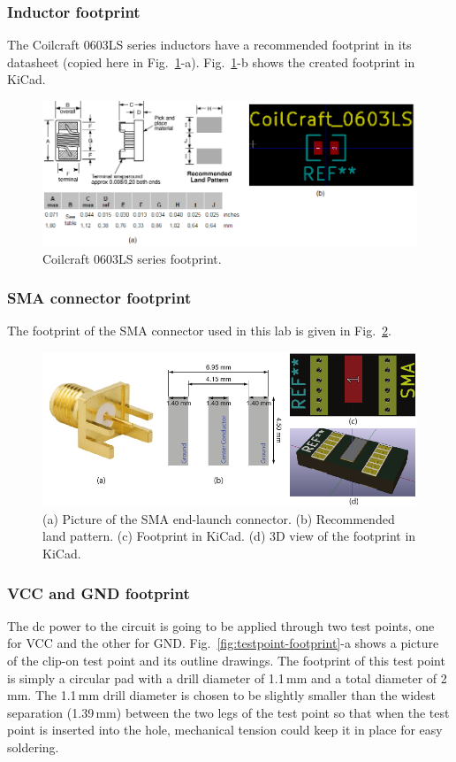 \documentclass[12pt,letterpaper]{scrartcl}
\begin{document}
\subsubsection{Inductor footprint}

The Coilcraft 0603LS series inductors have a recommended footprint in its datasheet (copied here in Fig.~\ref{fig:cc-0603ls}-a). Fig.~\ref{fig:cc-0603ls}-b shows the created footprint in KiCad. 

	\begin{figure}[ph]
		\centering
		\includegraphics[width=5.5in]{cc-0603ls}
		\caption{Coilcraft 0603LS series footprint.}
		\label{fig:cc-0603ls}
	\end{figure}

\subsubsection{SMA connector footprint}
The footprint of the SMA connector used in this lab is given in Fig.~\ref{fig:sma-footprint}. 

	\begin{figure}[ph]
		\centering
		\includegraphics[width=5.5in]{sma-footprint}
		\caption{(a) Picture of the SMA end-launch connector. (b) Recommended land pattern. (c) Footprint in KiCad. (d) 3D view of the footprint in KiCad. }
		\label{fig:sma-footprint}
	\end{figure}

\subsubsection{VCC and GND footprint}
The dc power to the circuit is going to be applied through two test points, one for VCC and the other for GND. Fig.~\ref{fig:testpoint-footprint}-a shows a picture of the clip-on test point and its outline drawings. The footprint of this test point is simply a circular pad with a drill diameter of 1.1\,mm and a total diameter of 2\,mm. The 1.1\,mm drill diameter is chosen to be slightly smaller than the widest separation (1.39\,mm) between the two legs of the test point so that when the test point is inserted into the hole, mechanical tension could keep it in place for easy soldering. 
\end{document}
